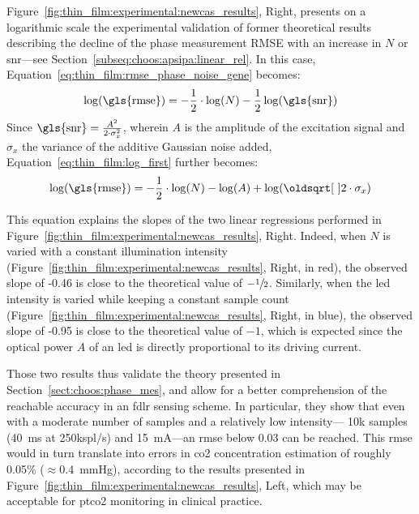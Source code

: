 Figure~\ref{fig:thin_film:experimental:newcas_results}, Right, presents on a logarithmic scale the experimental validation of former theoretical results describing the decline of the phase measurement RMSE with an increase in $N$ or \gls{snr}---see Section~\ref{subseq:choos:apsipa:linear_rel}. In this case, Equation~\ref{eq:thin_film:rmse_phase_noise_gene} becomes:
\begin{equation}\label{eq:thin_film:log_first}
	\log(\text{\gls{rmse}}) = -\frac{1}{2}\cdot \log(N) - \frac{1}{2}\log(\text{\gls{snr}})
\end{equation}
Since $\text{\gls{snr}} = \frac{A^2}{2\cdot \sigma_x^2}$, wherein $A$ is the amplitude of the excitation signal and $\sigma_x$ the variance of the additive Gaussian noise added, Equation~\ref{eq:thin_film:log_first} further becomes:
\begin{equation}\label{eq:thin_film:compact_rmse_A}
	\log(\text{\gls{rmse}}) = -\frac{1}{2}\cdot \log(N) - \log(A) + \log(\sqrt{2}\cdot \sigma_x)
\end{equation}

This equation explains the slopes of the two linear regressions performed in Figure~\ref{fig:thin_film:experimental:newcas_results}, Right. Indeed, when $N$ is varied with a constant illumination intensity (Figure~\ref{fig:thin_film:experimental:newcas_results}, Right, in red), the observed slope of -0.46 is close to the theoretical value of $-\sfrac{1}{2}$. Similarly, when the \gls{led} intensity is varied while keeping a constant sample count (Figure~\ref{fig:thin_film:experimental:newcas_results}, Right, in blue), the observed slope of -0.95 is close to the theoretical value of $-1$, which is expected since the optical power $A$ of an \gls{led} is directly proportional to its driving current.

Those two results thus validate the theory presented in Section~\ref{sect:choos:phase_mes}, and allow for a better comprehension of the reachable accuracy in an \gls{fdlr} sensing scheme. In particular, they show that even with a moderate number of samples and a relatively low intensity---\ie{} 10k samples (40~ms at 250kspl/s) and 15~mA---an \gls{rmse} below 0.03{\degree} can be reached. This \gls{rmse} would in turn translate into errors in \gls{co2} concentration estimation of roughly 0.05\% ($\approx$0.4~mmHg), according to the results presented in Figure~\ref{fig:thin_film:experimental:newcas_results}, Left, which may be acceptable for \gls{ptco2} monitoring in clinical practice\cite{conway2018}.

